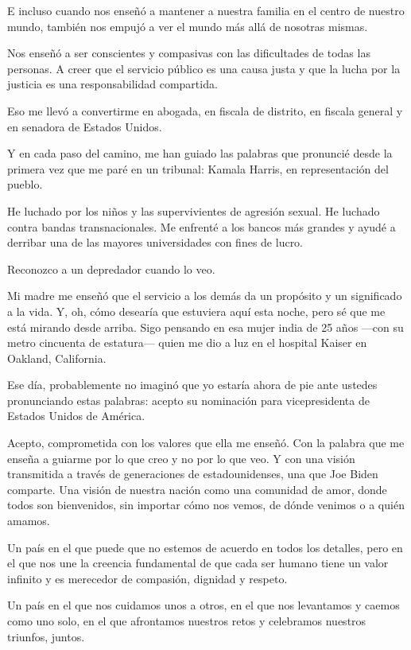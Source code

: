 E incluso cuando nos enseñó a mantener a nuestra familia en el centro de
nuestro mundo, también nos empujó a ver el mundo más allá de nosotras
mismas.

Nos enseñó a ser conscientes y compasivas con las dificultades de todas
las personas. A creer que el servicio público es una causa justa y que
la lucha por la justicia es una responsabilidad compartida.

Eso me llevó a convertirme en abogada, en fiscala de distrito, en
fiscala general y en senadora de Estados Unidos.

Y en cada paso del camino, me han guiado las palabras que pronuncié
desde la primera vez que me paré en un tribunal: Kamala Harris, en
representación del pueblo.

He luchado por los niños y las supervivientes de agresión sexual. He
luchado contra bandas transnacionales. Me enfrenté a los bancos más
grandes y ayudé a derribar una de las mayores universidades con fines de
lucro.

Reconozco a un depredador cuando lo veo.

Mi madre me enseñó que el servicio a los demás da un propósito y un
significado a la vida. Y, oh, cómo desearía que estuviera aquí esta
noche, pero sé que me está mirando desde arriba. Sigo pensando en esa
mujer india de 25 años ---con su metro cincuenta de estatura--- quien me
dio a luz en el hospital Kaiser en Oakland, California.

Ese día, probablemente no imaginó que yo estaría ahora de pie ante
ustedes pronunciando estas palabras: acepto su nominación para
vicepresidenta de Estados Unidos de América.

Acepto, comprometida con los valores que ella me enseñó. Con la palabra
que me enseña a guiarme por lo que creo y no por lo que veo. Y con una
visión transmitida a través de generaciones de estadounidenses, una que
Joe Biden comparte. Una visión de nuestra nación como una comunidad de
amor, donde todos son bienvenidos, sin importar cómo nos vemos, de dónde
venimos o a quién amamos.

Un país en el que puede que no estemos de acuerdo en todos los detalles,
pero en el que nos une la creencia fundamental de que cada ser humano
tiene un valor infinito y es merecedor de compasión, dignidad y respeto.

Un país en el que nos cuidamos unos a otros, en el que nos levantamos y
caemos como uno solo, en el que afrontamos nuestros retos y celebramos
nuestros triunfos, juntos.

